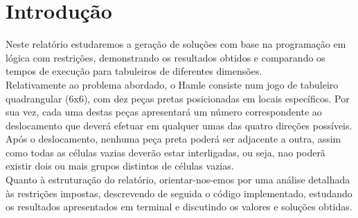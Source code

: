 \chapter{Introdu\c{c}\~ao}

Neste relat\'orio estudaremos a gera\c{c}\~ao de solu\c{c}\~oes com base na programa\c{c}\~ao em l\'ogica com restri\c{c}\~oes, demonstrando os resultados obtidos e comparando os tempos de execu\c{c}\~ao para tabuleiros de diferentes dimens\~oes.\\
Relativamente ao problema abordado, o Hamle consiste num jogo de tabuleiro quadrangular (6x6), com dez pe\c{c}as pretas posicionadas em locais espec\'ificos. Por sua vez, cada uma destas pe\c{c}as apresentar\'a um n\'umero correspondente ao deslocamento que dever\'a efetuar em qualquer umas das quatro dire\c{c}\~oes poss\'iveis. Ap\'os o deslocamento, nenhuma pe\c{c}a preta poder\'a ser adjacente a outra, assim como todas as c\'elulas vazias dever\~ao estar interligadas, ou seja, nao poder\~a existir dois ou mais grupos distintos de c\'elulas vazias.\\
Quanto \`a estrutura\c{c}\~ao do relat\'orio, orientar-nos-emos por uma an\'alise detalhada \`as restri\c{c}\~oes impostas, descrevendo de seguida o c\'odigo implementado, estudando os resultados apresentados em terminal e discutindo os valores e solu\c{c}\~oes obtidas.